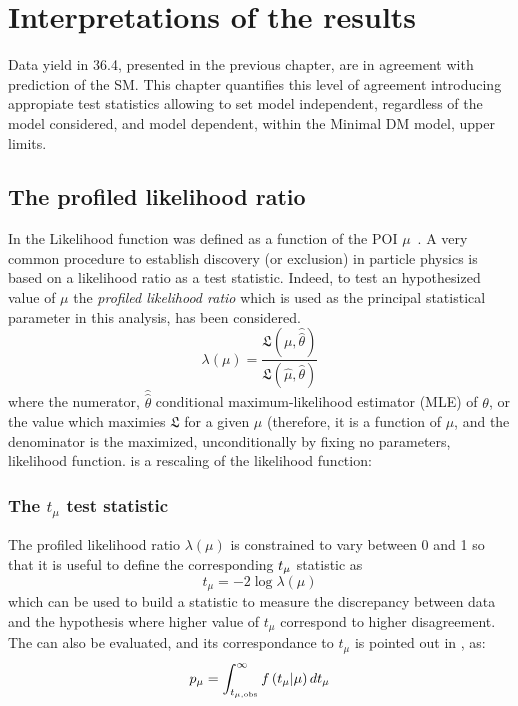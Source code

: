 \chapter{Interpretations of the results}

\lettrine{D}{}ata yield in \SI{36.4}{\ifb}, presented in the previous chapter, are in agreement with prediction of the SM. This chapter quantifies this level of agreement introducing appropiate test statistics allowing to set model independent, regardless of the model considered, and model dependent, within the Minimal DM model, upper limits.

\section{The profiled likelihood ratio}
In \Sect{\ref{sec:likelihood}} the Likelihood function was defined as a function of the POI $\mu$~\cite{Cowan}.
A very common procedure to establish discovery (or exclusion) in particle physics is based on a likelihood ratio as a test statistic. Indeed, to test an hypothesized value of $\mu$ the \emph{profiled likelihood ratio} which is used as the principal statistical parameter in this analysis, has been considered.
\begin{equation}
  \lambda(\mu) = \frac {\mathfrak{L}(\mu,\hat{\hat{\theta}})}{\mathfrak{L(\hat{\mu},\hat{\theta})}}
  \label{eqn:profiled}
\end{equation}
where the numerator, $\hat{\hat{\theta}}$ conditional maximum-likelihood estimator (MLE) of $\theta$, or the value which maximies $\mathfrak{L}$ for a given $\mu$ (therefore, it is a function of $\mu$, and the denominator is the maximized, unconditionally by fixing no parameters, likelihood function. \Eqn{\ref{eqn:profiled}} is a rescaling of the likelihood function: 

\subsection{The $t_\mu$ test statistic}
The profiled likelihood ratio $\lambda(\mu)$ is constrained to vary between 0 and 1 so that it is useful to define the corresponding $t_{\mu}$ statistic as 
\begin{equation}
  t_{\mu} = -2 \log{\lambda(\mu)}
\end{equation}
which can be used to build a statistic to measure the discrepancy between data and the hypothesis where higher value of $t_{\mu}$ correspond to higher disagreement. The \p can also be evaluated, and its correspondance to $t_{\mu}$ is pointed out in \Fig{\ref{pvalue}}, as:
\begin{equation}
 p_{\mu}=\int_{t_{\mu,\textup{obs}}}^\infty f\left(t_\mu \vert \mu\right) dt_\mu
 \label{eqn:pdatmu}
\end{equation}

